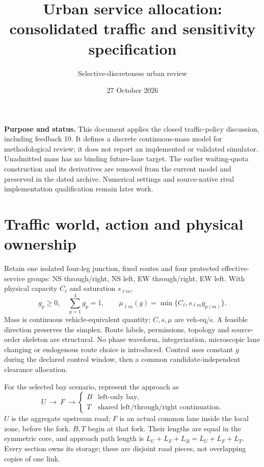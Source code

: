 \documentclass[10pt,a4paper]{article}
\title{Urban service allocation:\\consolidated traffic and sensitivity specification}
\author{Selective-discreteness urban review}
\date{27 October 2026}
\begin{document}
\maketitle

\textbf{Purpose and status.}
This document applies the closed traffic-policy discussion, including
feedback 10. It defines a discrete continuous-mass model for methodological
review; it does not report an implemented or validated simulator.
Unadmitted mass has no binding future-lane target. The earlier waiting-quota
construction and its derivatives are removed from the current model and
preserved in the dated archive. Numerical settings and source-native
rival implementation qualification remain later work.

\section{Traffic world, action and physical ownership}

Retain one isolated four-leg junction, fixed routes and four protected
effective-service groups: NS through/right, NS left, EW through/right,
EW left. With physical capacity $C_\ell$ and saturation $s_{\ell m}$,
\begin{equation}
 g_p\geq0,\quad \sum_{p=1}^4g_p=1,\qquad
 \mu_{\ell m}(g)=\min\{C_\ell,s_{\ell m}g_{p(m)}\}.
 \label{eq:action}
\end{equation}
Mass is continuous vehicle-equivalent quantity; $C,s,\mu$ are veh-eq/s.
A feasible direction preserves the simplex. Route labels, permissions,
topology and source-order skeleton are structural. No phase waveform,
integerization, microscopic lane changing or endogenous route choice is
introduced. Control uses constant $g$ during the declared control window,
then a common candidate-independent clearance allocation.

For the selected bay scenario, represent the approach as
\begin{equation}
 U\ \longrightarrow\ F\
 \longrightarrow
 \begin{cases}
 B&\text{left-only bay},\\
 T&\text{shared left/through/right continuation}.
 \end{cases}
 \label{eq:geometry}
\end{equation}
$U$ is the aggregate upstream road; $F$ is an actual common lane inside
the local zone, before the fork. $B,T$ begin at that fork. Their lengths
are equal in the symmetric core, and approach path length is
$L_U+L_F+L_B=L_U+L_F+L_T$. Every section owns its storage; these are
disjoint road pieces, not overlapping copies of one link.
\end{document}
